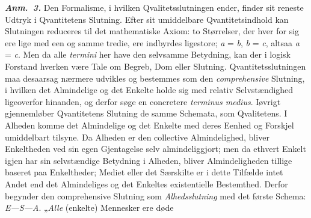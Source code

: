 \documentclass[12pt]{book}
\newcommand{\anm}[1]{\emph{\textbf{Anm.~#1.}}}
\newcommand{\opage}[1]{\marginnote{\footnotesize\textit{[#1]}}}
\begin{document}
\anm{3} Den Formalisme, i hvilken Qvalitetsslutningen ender, finder sit reneste
Udtryk i Qvantitetens Slutning. Efter sit umiddelbare Qvantitetsindhold kan
Slutningen reduceres til det mathematiske Axiom: to Størrelser, der hver for sig ere
lige med een og samme tredie, ere indbyrdes ligestore; \textit{a} = \textit{b},
\textit{b} = \textit{c}, altsaa \textit{a} = \textit{c}. Men da alle
\textit{termini} her have den selvsamme Betydning, kan der i logisk Forstand
hverken være Tale om Begreb, Dom eller Slutning. Qvantitetsslutningen maa desaarsag
nærmere udvikles og bestemmes som den \emph{comprehensive} Slutning, i hvilken det
Almindelige og det Enkelte holde sig med relativ Selvstændighed ligeoverfor
hinanden, og derfor søge en concretere \textit{terminus medius}. Iøvrigt
gjennemløber Qvantitetens Slutning de samme Schemata, som Qvalitetens. I Alheden
komme det Almindelige og det Enkelte med deres Eenhed og Forskjel umiddelbart
tilsyne. Da Alheden er den collective Almindelighed, bliver Enkeltheden ved sin egen
Gjentagelse selv almindeliggjort; men da ethvert Enkelt igjen har sin selvstændige
Betydning i Alheden, bliver Almindeligheden tillige baseret paa Enkeltheder; Mediet
eller det Særskilte er i dette Tilfælde intet Andet end det Almindeliges og det
Enkeltes existentielle Bestemthed. Derfor begynder den comprehensive Slutning som
\emph{Alhedsslutning} med det første Schema: \textit{E---S---A}. „\emph{Alle}
(enkelte) Mennesker ere døde%
\opage{80}%
\end{document}
